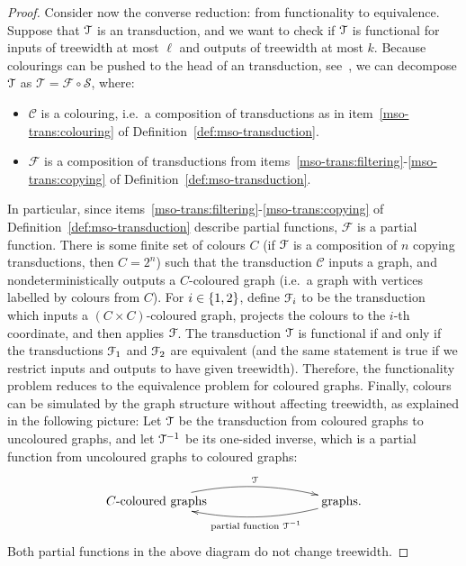 \begin{proof}
    Consider now the converse reduction: from functionality to equivalence. Suppose that ${\mathcal T}$ is an \mso transduction, and we want to check if ${\mathcal T}$ is functional for inputs of treewidth at most $\ell$ and outputs of treewidth at most $k$. Because colourings can be pushed to the head of an \mso transduction, see~\cite[Section 1.7]{courcelleGraphStructureMonadic2012}, we can decompose ${\mathcal T}$ as $\mathcal T =  \mathcal F \circ \mathcal S$, where:
    \begin{itemize}
        \item $\mathcal C$ is a colouring, i.e.~a composition of transductions as in item~\ref{mso-trans:colouring} of Definition~\ref{def:mso-transduction}.
        \item $\mathcal F$ is a composition of transductions from items~\ref{mso-trans:filtering}-\ref{mso-trans:copying} of Definition~\ref{def:mso-transduction}.
    \end{itemize}
    In particular, since items~\ref{mso-trans:filtering}-\ref{mso-trans:copying} of Definition~\ref{def:mso-transduction} describe partial functions,  $\mathcal F$ is a partial function. There is some finite set of colours $C$ (if ${\mathcal F}$ is a composition of $n$ copying transductions, then $C=2^n$) such that the  transduction $\mathcal C$ inputs a graph, and nondeterministically outputs a $C$-coloured graph (i.e.~a graph with vertices labelled by colours from $C$). For $i  \in \{1,2\}$, define ${\mathcal F}_i$ to be the \mso transduction which inputs a $(C \times C)$-coloured  graph, projects the colours to the $i$-th coordinate, and then applies ${\mathcal F}$. The transduction ${\mathcal T}$ is functional if and only if the transductions ${\mathcal F}_1$ and ${\mathcal F}_2$ are equivalent (and the same statement is true if we restrict inputs and outputs to have given treewidth). Therefore, the functionality problem reduces to the equivalence problem for coloured graphs. Finally, colours can be simulated by the graph structure without affecting treewidth,  as explained in the following picture:
    Let ${\mathcal T}$ be the \mso transduction from coloured graphs to uncoloured graphs, and let ${\mathcal T}^{-1}$ be its one-sided inverse, which is a partial function from uncoloured graphs to coloured graphs:
    \begin{align*}
        \xymatrix@C=3cm{
            \text{$C$-coloured graphs}
            \ar@/^1pc/[r]^-{\Tt} &
            \text{graphs}.
            \ar@/^1pc/[l]^-{\text{partial function }\Tt^{-1}}
        }
        \end{align*}
    Both partial functions in the above diagram do not change treewidth. 

\end{proof}
